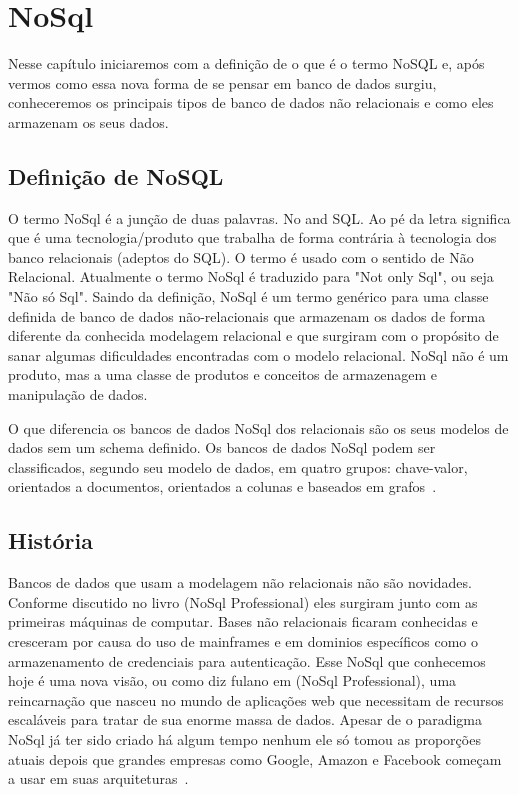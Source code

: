 \chapter{NoSql}

Nesse capítulo iniciaremos com a definição de o que é o termo NoSQL e, após vermos como essa nova forma de se pensar em banco de dados surgiu, conheceremos os principais tipos de banco de dados não relacionais e como eles armazenam os seus dados. 


\section{Definição de NoSQL}

O termo NoSql é a junção de duas palavras. No and SQL. Ao pé da letra significa que é uma tecnologia/produto que trabalha de forma contrária à tecnologia dos banco relacionais (adeptos do SQL). O termo é usado com o sentido de Não Relacional. Atualmente o termo NoSql é traduzido para "Not only Sql", ou seja "Não só Sql".
Saindo da definição, NoSql é um termo genérico para uma classe definida de banco de dados não-relacionais que armazenam os dados  de forma diferente da conhecida modelagem relacional e que surgiram com o propósito de sanar algumas dificuldades encontradas com o modelo relacional. NoSql não é um produto, mas a uma classe de produtos e conceitos de armazenagem e manipulação de dados. 

O que diferencia os bancos de dados NoSql dos relacionais são os seus modelos de dados sem um schema definido. Os bancos de dados NoSql podem ser classificados, segundo seu modelo de dados, em quatro grupos: chave-valor, orientados a documentos, orientados a colunas e baseados em grafos~\cite{nosqlxrelacional,nosqlevaluation}.

\section{História}

Bancos de dados que usam a modelagem não relacionais não são novidades. Conforme discutido no livro (NoSql Professional) eles surgiram junto com as primeiras máquinas de computar. Bases não relacionais ficaram conhecidas e cresceram por causa do uso de mainframes e em dominios específicos como o armazenamento de credenciais para autenticação. Esse NoSql que conhecemos hoje é uma nova visão, ou como diz fulano em (NoSql Professional), uma reincarnação que nasceu no mundo de aplicações web que necessitam de recursos escaláveis para tratar de sua enorme massa de dados. Apesar de o paradigma NoSql já ter sido criado há algum tempo nenhum ele só tomou as proporções atuais depois que grandes empresas como Google, Amazon e Facebook começam a usar em suas arquiteturas~\cite{nosqlevaluation}.

